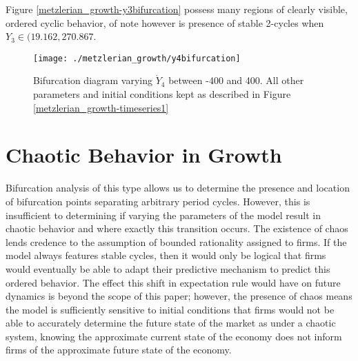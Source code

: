 Figure \ref{metzlerian_growth-y3bifurcation} possess many regions of clearly visible, ordered cyclic behavior, of note however is presence of stable 2-cycles when $Y_3\in (19.162, 270.867$.

\begin{figure}
    \centering
    \texttt{[image: ./metzlerian\_growth/y4bifurcation]}
    \caption{Bifurcation diagram varying $\dot Y_4$ between -400 and 400. All other parameters and initial conditions kept as described in Figure \ref{metzlerian_growth-timeseries1}}
    \label{metzlerian_growth-y4bifurcation}
\end{figure}

\section{Chaotic Behavior in Growth}
Bifurcation analysis of this type allows us to determine the presence and location of bifurcation points separating arbitrary period cycles. However, this is insufficient to determining if varying the parameters of the model result in chaotic behavior and where exactly this transition occurs. The existence of chaos lends credence to the assumption of bounded rationality assigned to firms. If the model always features stable cycles, then it would only be logical that firms would eventually be able to adapt their predictive mechanism to predict this ordered behavior. The effect this shift in expectation rule would have on future dynamics is beyond the scope of this paper; however, the presence of chaos means the model is sufficiently sensitive to initial conditions that firms would not be able to accurately determine the future state of the market as under a chaotic system, knowing the approximate current state of the economy does not inform firms of the approximate future state of the economy. 

